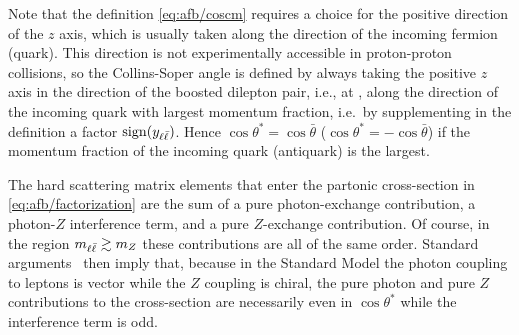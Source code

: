 Note that the definition \cref{eq:afb/coscm} requires a choice for the positive
direction of the $z$ axis, which is usually taken along the direction of the
incoming fermion (quark).
%
This direction is  not experimentally accessible in proton-proton collisions,
so the Collins-Soper angle is defined by always taking the positive $z$ axis in
the direction of the boosted dilepton pair, i.e., at \lo, along the direction of
the incoming quark with largest momentum fraction, i.e.\ by supplementing in
the definition a factor $\operatorname{sign}(y_{\ell\bar{\ell}})$.
%
Hence $\cos\theta^*=\cos{\bar\theta}$ ($\cos\theta^*=-\cos{\bar\theta}$)  if
the momentum fraction of the incoming quark (antiquark) is the largest.

%
The hard scattering matrix elements that enter the partonic cross-section
in \cref{eq:afb/factorization} are the sum of a pure photon-exchange
contribution, a photon-$Z$ interference term, and a pure $Z$-exchange
contribution.
%
Of course, in the region
$m_{\ell\bar{\ell}} \gtrsim m_Z$ these contributions are all of the same order.
%
Standard arguments~\cite{Peskin:1995ev} then imply that, because in the
Standard Model the photon
coupling to leptons is vector  while the $Z$ coupling is chiral,
the pure photon and pure $Z$ contributions to the cross-section are
necessarily  even in $\cos\theta^*$ while the interference term is
odd.


